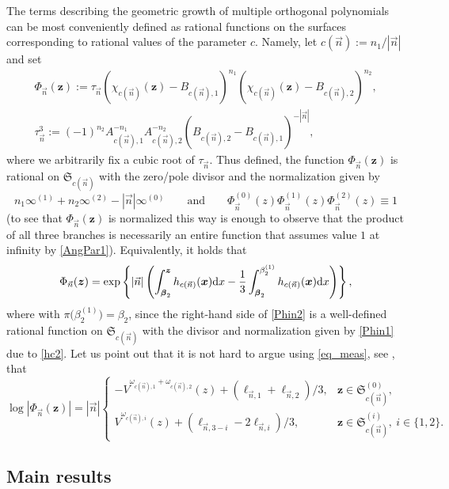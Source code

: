 \documentclass[10pt,a4paper]{amsart}
\numberwithin{equation}{section}
\newcommand{\n}{{\vec n}}
\newcommand{\RS}{\boldsymbol{\mathfrak{S}}}
\newcommand{\z}	{{\boldsymbol z}}
\newcommand{\x}	{{\boldsymbol x}}
\begin{document}
The terms describing the geometric growth of multiple orthogonal polynomials can be most conveniently defined as rational functions on the surfaces corresponding to rational values of the parameter $ c $. Namely, let $ c(\n) := n_1/|\n| $ and set
\begin{gather}
\Phi_\n(\z) := \tau_\n(\chi_{c(\n)}(\z)-B_{c(\n),1})^{n_1}(\chi_{c(\n)}(\z)-B_{c(\n),2})^{n_2}, \nonumber \\
\tau_\n^3 := (-1)^{n_2}A_{c(\n),1}^{-n_1}A_{c(\n),2}^{-n_2}(B_{c(\n),2}-B_{c(\n),1})^{-|\n|},\label{Phin}
\end{gather}
where we arbitrarily fix a cubic root of $ \tau_\n $. Thus defined, the function $ \Phi_\n(\z) $ is rational on $ \RS_{c(\n)} $ with the zero/pole divisor and the normalization given by
\begin{equation}
\label{Phin1}
n_1\infty^{(1)} + n_2\infty^{(2)} - |\n|\infty^{(0)} \qquad \text{and}\qquad  \Phi_\n^{(0)}(z)\Phi_\n^{(1)}(z)\Phi_\n^{(2)}(z) \equiv 1
\end{equation}
(to see that $ \Phi_\n(\z) $ is normalized this way is enough to observe that the product of all three branches is necessarily an entire function that assumes value $ 1 $ at infinity by \eqref{AngPar1}). Equivalently, it holds that
\begin{equation}
\label{Phin2}
\Phi_\n(\z) = \exp\left\{ |\n| \left(\int_{\boldsymbol \beta_2}^\z h_{c(\n)}(\x) {\rm d}x - \frac13\int_{\boldsymbol \beta_2}^{\beta_2^{(1)}} h_{c(\n)}(\x) {\rm d}x\right) \right\},
\end{equation}
where \smash{$ \beta_2^{(1)}\in\RS_{c(\n)}^{(1)} $} with $ \pi\bigl(\beta_2^{(1)}\bigr) = \beta_2 $, since the right-hand side of \eqref{Phin2} is a well-defined rational function on $ \RS_{c(\n)} $ with the divisor and normalization given by \eqref{Phin1} due to \eqref{hc2}. Let us point out that it is not hard to argue using \eqref{eq_meas}, see \cite[Proposition~2.1]{Ya16}, that
\begin{equation}
\label{Phin3}
\log|\Phi_\n(\z)| = |\n|\begin{cases}
-V^{\omega_{c(\n),1}+\omega_{c(\n),2}}(z)+ (\ell_{\n,1}+\ell_{\n,2})/3, & \z\in\RS_{c(\n)}^{(0)}, \\
V^{\omega_{c(\n),i}}(z)+ (\ell_{\n,3-i}-2\ell_{\n,i})/3, & \z\in\RS_{c(\n)}^{(i)}, \ i\in\{1,2\}.
\end{cases}
\end{equation}

\subsection{Main results}
\end{document}
